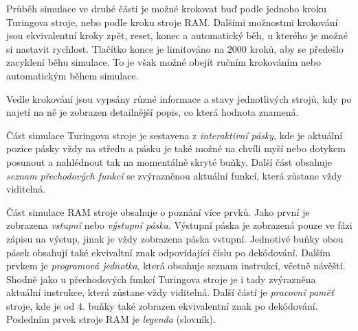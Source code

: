 Průběh simulace ve druhé části je možné krokovat buď podle jednoho kroku Turingova stroje, nebo podle kroku stroje RAM.
Dalšími možnostmi krokování jsou ekvivalentní kroky zpět, reset, konec a automatický běh, u kterého je možné si nastavit rychlost.
Tlačítko konce je limitováno na $2000$ kroků, aby se předešlo zacyklení běhu simulace. 
To je však možné obejít ručním krokováním nebo automatickým během simulace.

Vedle krokování jsou vypsány různé informace a stavy jednotlivých strojů, 
kdy po najetí na ně je zobrazen detailnější popis, co která hodnota znamená.

Část simulace Turingova stroje je sestavena z \textit{interaktivní pásky}, kde je aktuální pozice pásky vždy na středu a pásku je také možné
na chvíli myší nebo dotykem posunout a nahlédnout tak na momentálně skryté buňky. 
Další část obsahuje \textit{seznam přechodových funkcí} se zvýrazněnou aktuální funkcí, která zůstane vždy viditelná.

Část simulace RAM stroje obsahuje o poznání více prvků. Jako první je zobrazena \textit{vstupní} nebo \textit{výstupní páska}.
Výstupní páska je zobrazená pouze ve fázi zápisu na výstup, jinak je vždy zobrazena páska vstupní. 
Jednotivé buňky obou pásek obsahují také ekvivaltní znak odpovídající číslu po dekódování.
Dalším prvkem je \textit{programová jednotka}, která obsahuje seznam instrukcí, včetně návěští.
Shodně jako u přechodových funkcí Turingova stroje je i tady zvýrazněna aktuální instrukce, která zůstane vždy viditelná.
Další částí je \textit{pracovní paměť} stroje, kde je od 4. buňky také zobrazen ekvivalentní znak po dekódování.
Posledním prvek stroje RAM je \textit{legenda} (slovník).